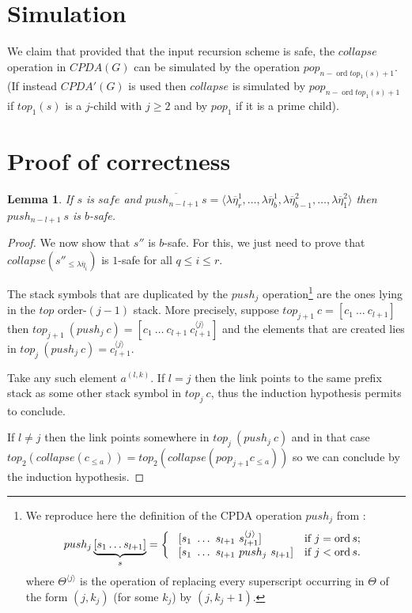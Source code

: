 \documentclass{article}
\newcommand{\ord}{\mathop{\mathrm{ord}}}
\newcommand{\prefixof}{\leqslant}
\newtheorem{lemma}{Lemma}[section]
\theoremstyle{remark}
\theoremstyle{definition}
\newcommand\orddec\overline
\begin{document}
\section{Simulation}

We claim that provided that the input recursion scheme is safe, the
$collapse$ operation in $CPDA(G)$ can be simulated by the operation
$pop_{n-\ord{top_1(s)}+1}$. (If instead $CPDA'(G)$ is used then
$collapse$ is simulated by $pop_{n-\ord{top_1(s)}+1}$ if $top_1(s)$
is a $j$-child with $j\geq 2$ and by $pop_1$ if it is a prime
child).

\section{Proof of correctness}

\begin{lemma}
  \label{lem:pushj_safe_implies_b-safe}
If $s$ is $safe$ and $\orddec{push_{n-l+1}\ s} = \langle \lambda
\overline{\eta}_r^1 , \ldots,  \lambda \overline{\eta}_{b}^1,
\lambda \overline{\eta}_{b-1}^2, \ldots,
 \lambda \overline{\eta}_1^2 \rangle$
then $push_{n-l+1}\ s$ is $b$-safe.
\end{lemma}
\begin{proof}
\hrulefill

 We now show that $s''$ is $b$-safe. For this, we just need to
prove that $collapse(s''_{\prefixof \lambda \overline{\eta}_{i}})$
is $1$-safe for all $q \leq i \leq r$.

The stack symbols that are duplicated by the $push_j$
operation\footnote{We reproduce here the definition of the CPDA
operation $push_j$ from \cite{hague-sto07}:
$$ push_j \underbrace{[ s_1 \ldots s_{l+1} ]}_{s} =
\left\{
  \begin{array}{ll}
\    [s_1\ \ldots\ s_{l+1}\ s_{l+1}^{\langle j \rangle}]  &\hbox{if $j = \ord{s}$;}\\
\    [s_1\ \ldots\ s_{l+1}\ push_j\ s_{l+1}]  &\hbox{if $j<\ord{s}$.}
 \end{array}
\right.
$$
where $\Theta^{\langle j \rangle}$ is the operation of replacing
every superscript occurring in $\Theta$ of the form $(j,k_j)$ (for
some $k_j$) by $(j,k_j+1)$.} are the ones lying in the $top$
order-$(j-1)$ stack. More precisely, suppose $top_{j+1}\ c = [c_1\
\ldots\ c_{l+1}]$ then $top_{j+1}\ (push_j\ c) = [c_1\ \ldots\
c_{l+1}\ c_{l+1}^{\langle j \rangle}]$ and the elements that are
created lies in $top_j\ (push_j\ c) = c_{l+1}^{\langle j \rangle}$.

Take any such element $a^{(l,k)}$. If $l=j$ then the link points to
the same prefix stack as some other stack symbol in $top_j\ c$, thus
the induction hypothesis permits to conclude.

If $l \neq j$ then the link points somewhere in $top_j\ (push_j\ c)$
and in that case $top_2( collapse(c_{\prefixof{a}})) = top_2(
collapse( pop_{j+1} c_{\prefixof{a}}))$ so we can conclude by the
induction hypothesis.



\hrulefill


\end{proof}
\end{document}
